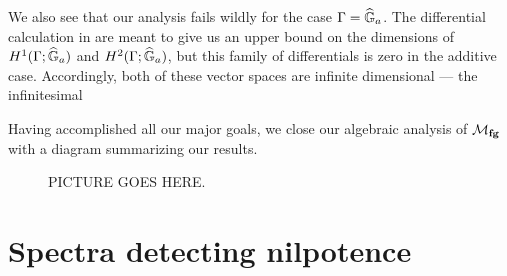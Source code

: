 \begin{remark}
We also see that our analysis fails wildly for the case $\Gamma = \widehat{\mathbb G}_a$.  The differential calculation in  are meant to give us an upper bound on the dimensions of $H^1(\Gamma; \widehat{\mathbb G}_a)$ and $H^2(\Gamma; \widehat{\mathbb G}_a)$, but this family of differentials is zero in the additive case.  Accordingly, both of these vector spaces are infinite dimensional --- the infinitesimal 
\end{remark}


Having accomplished all our major goals, we close our algebraic analysis of $\mathcal{M}_{\mathbf{fg}}$ with a diagram summarizing our results.
\begin{landscape}
\begin{figure}[b]
PICTURE GOES HERE.
\end{figure}
\end{landscape}








\section{Spectra detecting nilpotence}

